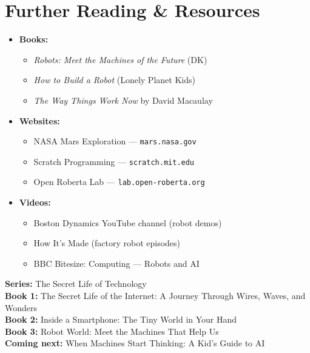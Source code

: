 \sectionrule

\section*{Further Reading \& Resources}

\begin{itemize}
  \item \textbf{Books:}
    \begin{itemize}
      \item \emph{Robots: Meet the Machines of the Future} (DK)
      \item \emph{How to Build a Robot} (Lonely Planet Kids)
      \item \emph{The Way Things Work Now} by David Macaulay
    \end{itemize}
  \item \textbf{Websites:}
    \begin{itemize}
      \item NASA Mars Exploration --- \texttt{mars.nasa.gov}
      \item Scratch Programming --- \texttt{scratch.mit.edu}
      \item Open Roberta Lab --- \texttt{lab.open-roberta.org}
    \end{itemize}
  \item \textbf{Videos:}
    \begin{itemize}
      \item Boston Dynamics YouTube channel (robot demos)
      \item How It's Made (factory robot episodes)
      \item BBC Bitesize: Computing --- Robots and AI
    \end{itemize}
\end{itemize}

\sectionrule

\begin{tcolorbox}[enhanced,colback=LightGray,colframe=RoboGreen!40,arc=6pt,boxrule=0.8pt,
  left=10pt,right=10pt,top=8pt,bottom=8pt]
\textbf{Series:} The Secret Life of Technology\\
\textbf{Book 1:} The Secret Life of the Internet: A Journey Through Wires, Waves, and Wonders \checkmark\\
\textbf{Book 2:} Inside a Smartphone: The Tiny World in Your Hand \checkmark\\
\textbf{Book 3:} Robot World: Meet the Machines That Help Us \checkmark\\
\textbf{Coming next:} When Machines Start Thinking: A Kid's Guide to AI
\end{tcolorbox}
